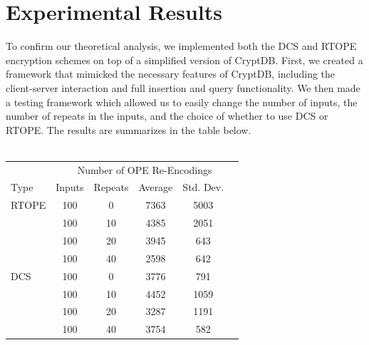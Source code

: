 \documentclass[12pt]{article}
\begin{document}
\section{Experimental Results}
To confirm our theoretical analysis, we implemented both the DCS and RTOPE encryption schemes on top of a simplified version of CryptDB. First, we created a framework that mimicked the necessary features of CryptDB, including the client-server interaction and full insertion and query functionality. We then made a testing framework which allowed us to easily change the number of inputs, the number of repeats in the inputs, and the choice of whether to use DCS or RTOPE. The results are summarizes in the table below. \\ \\
\begin{table} %
\centering %
\begin{tabular}{l c c c c} %
\toprule %
& \multicolumn{5}{c}{Number of OPE Re-Encodings} \\ %
\cmidrule(l){2-6} %
Type & Inputs & Repeats & Average & Std. Dev.\\ %
\midrule %
RTOPE & 100 & 0  & 7363 & 5003 \\
      & 100 & 10  & 4385 & 2051 \\
      & 100 & 20  & 3945 & 643\\
      & 100 & 40  & 2598 & 642\\
      \midrule
DCS   & 100 & 0  & 3776 & 791 \\
      & 100 & 10  & 4452 & 1059 \\
      & 100 & 20  & 3287 & 1191\\
      & 100 & 40  & 3754 & 582\\

\end{tabular}
\end{table}
\end{document}
